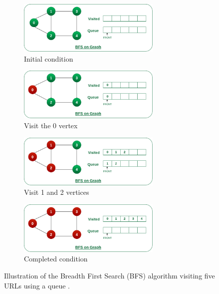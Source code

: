 \begin{figure}[ht] 
  \begin{subfigure}[b]{0.5\textwidth}
    \centering
    \includegraphics[width=0.75\textwidth]{figures/bfs-1.png} 
    \caption{Initial condition} 
    \label{fig:bfs-a} 
    \vspace{4ex}
  \end{subfigure}%
  \begin{subfigure}[b]{0.5\textwidth}
    \centering
    \includegraphics[width=0.75\textwidth]{figures/bfs-2.png} 
    \caption{Visit the 0 vertex}  
    \label{fig:bfs-b} 
    \vspace{4ex}
  \end{subfigure} 
  \begin{subfigure}[b]{0.5\textwidth}
    \centering
    \includegraphics[width=0.75\textwidth]{figures/bfs-3.png} 
    \caption{Visit 1 and 2 vertices} 
    \label{fig:bfs-c} 
  \end{subfigure}%
  \begin{subfigure}[b]{0.5\textwidth}
    \centering
    \includegraphics[width=0.75\textwidth]{figures/bfs-4.png} 
    \caption{Completed condition} 
    \label{fig:bfs-d} 
  \end{subfigure} 
  \caption{Illustration of the Breadth First Search (BFS) algorithm visiting five URLs using a queue
 \cite{bfs}.}
  \label{fig:bfs} 
\end{figure}

